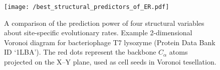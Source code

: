 \documentclass[11pt]{article}
\begin{document}
    \begin{figure}[tbh]
        \begin{center}
        \texttt{[image: /best\_structural\_predictors\_of\_ER.pdf]}
        \end{center}
        \caption{A comparison of the prediction power of four structural variables about site-specific evolutionary rates. Example 2-dimensional Voronoi diagram for bacteriophage T7 lysozyme (Protein Data Bank ID `1LBA'). The red dots represent the backbone $C_\alpha$ atoms projected on the X--Y plane, used as cell seeds in Voronoi tesellation.}
        \label{fig:best_predictor}
    \end{figure}




\end{document}

